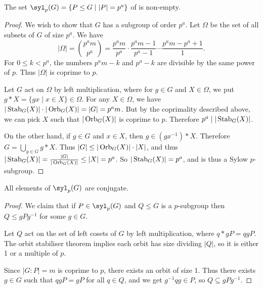 \documentclass[a4paper]{scrartcl}
\begin{document}
\begin{theorem}
	The set $\syl_p(G) = \{P \leq G \mid |P| = p^a \}$ of  is non-empty.
\end{theorem}
\begin{proof}
	We wish to show that $G$ has a subgroup of order $p^a$.
	Let $\Omega$ be the set of all subsets of $G$ of size $p^a$.
	We have
	$$
	|\Omega| = \binom{p^a m}{p^a} = \frac{p^a m}{p^a} \cdot \frac{p^a m - 1}{p^a - 1} \cdots \frac{p^a m - p^a + 1}{1}.
	$$
	For $0 \leq k < p^a$, the numbers $p^am - k$ and $p^a  -k$ are divisible by the same power of $p$. Thus $|\Omega|$ is coprime to $p$.

	Let $G$ act on $\Omega$ by left multiplication, where for $g \in G$ and $X \in \Omega$, we put $g*X = \{gx \mid x \in X\} \in \Omega$. For any $X \in \Omega$, we have $|\operatorname{Stab}_G(X)| \cdot |\operatorname{Orb}_G(X)| = |G| = p^a m$. But by the coprimality described above, we can pick $X$ such that $|\operatorname{Orb}_G(X)|$ is coprime to $p$. Therefore $p^a \mid |\operatorname{Stab}_G(X)|$.

On the other hand, if $g \in G$ and $x \in X$, then $g \in (g x^{-1}) * X$. Therefore $G = \bigcup_{g \in G} g*X$. Thus $|G| \leq |\operatorname{Orb}_G(X)| \cdot |X|$, and thus $|\operatorname{Stab}_G(X)| = \frac{|G|}{|\operatorname{Orb}_G(X)|} \leq |X| = p^a$. So $|\operatorname{Stab}_G(X)| = p^a$, and is thus a Sylow $p$-subgroup.
\end{proof}

\begin{theorem}
	All elements of $\syl_p(G)$ are conjugate.
\end{theorem}
\begin{proof}
	We claim that if $P \in \syl_p(G)$ and $Q \leq G$ is a $p$-subgroup then $Q \leq gPg^{-1}$ for some $g \in G$.
	
	Let $Q$ act on the set of left cosets of $G$ by left multiplication, where $q * gP = qgP$. The orbit stabiliser theorem implies each orbit has size dividing $|Q|$, so it is either 1 or a multiple of $p$. 

	Since $|G:P| = m$ is coprime to $p$, there exists an orbit of size 1. Thus there exists $g \in G$ such that $qgP = gP$ for all $q \in Q$, and we get $g^{-1}q g \in P$, so $Q \subseteq gPg^{-1}$.
\end{proof}
\end{document}
